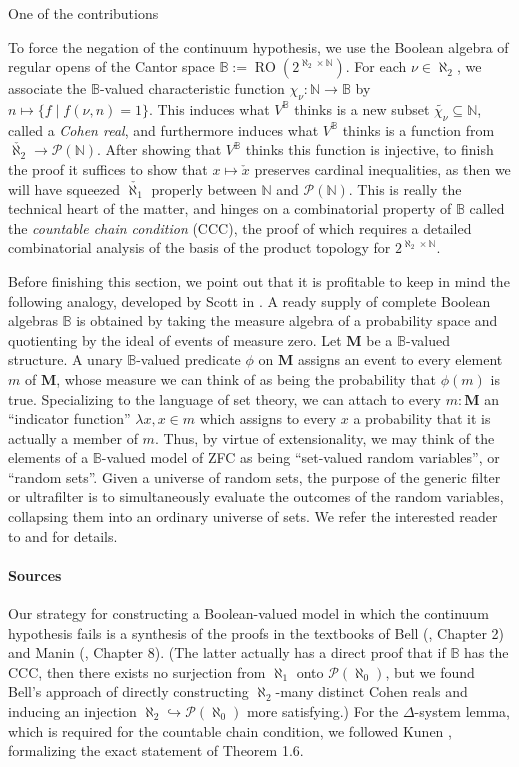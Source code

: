 \documentclass[a4paper,USenglish,cleveref, autoref]{lipics-v2019}
\newcommand{\B}{\mathbb{B}}
\begin{document}
One of the contributions 

To force the negation of the continuum hypothesis, we use the Boolean algebra of regular opens of the Cantor space $\B := \operatorname{RO}(2^{\aleph_2 \times \mathbb{N}})$. For each $\nu \in \aleph_2$, we associate the $\B$-valued characteristic function $\chi_\nu : \mathbb{N} \to \B$ by $n \mapsto \{f \operatorname{|} f(\nu, n) = 1\}$. This induces what $V^\B$ thinks is a new subset $\widetilde{\chi_{\nu}} \subseteq \mathbb{N}$, called a \emph{Cohen real}, and furthermore induces what $V^\B$ thinks is a function from $\check{\aleph_2} \to \mathcal{P}(\mathbb{N})$. After showing that $V^\B$ thinks this function is injective, to finish the proof it suffices to show that $x \mapsto \check{x}$ preserves cardinal inequalities, as then we will have squeezed $\check{\aleph_1}$ properly between $\mathbb{N}$ and $\mathcal{P}(\mathbb{N})$. This is really the technical heart of the matter, and hinges on a combinatorial property of $\B$ called the \emph{countable chain condition} (CCC), the proof of which requires a detailed combinatorial analysis of the basis of the product topology for $2^{\aleph_2 \times \mathbb{N}}$.

Before finishing this section, we point out that it is profitable to keep in mind the following analogy, developed by Scott in \cite{scott1}. A ready supply of complete Boolean algebras $\B$ is obtained by taking the measure algebra of a probability space and quotienting by the ideal of events of measure zero. Let $\mathbf{M}$ be a $\B$-valued structure. A unary $\B$-valued predicate $\phi$ on $\mathbf{M}$ assigns an event to every element $m$ of $\mathbf{M}$, whose measure we can think of as being the probability that $\phi(m)$ is true. Specializing to the language of set theory, we can attach to every $m : \mathbf{M}$ an ``indicator function'' $\lambda x, x \in m$ which assigns to every $x$ a probability that it is actually a member of $m$. Thus, by virtue of extensionality, we may think of the elements of a $\B$-valued model of ZFC as being ``set-valued random variables'', or ``random sets''. Given a universe of random sets, the purpose of the generic filter or ultrafilter is to simultaneously evaluate the outcomes of the random variables, collapsing them into an ordinary universe of sets. We refer the interested reader to \cite{scott1} and \cite{moore1} for details.

\paragraph*{Sources}
Our strategy for constructing a Boolean-valued model in which the continuum hypothesis fails is a synthesis of the proofs in the textbooks of Bell (\cite{bell1}, Chapter 2) and Manin (\cite{manin1}, Chapter 8). (The latter actually has a direct proof that if $\B$ has the CCC, then there exists no surjection from $\aleph_1$ onto $\mathcal{P}(\aleph_0)$, but we found Bell's approach of directly constructing $\aleph_2$-many distinct Cohen reals and inducing an injection $\aleph_2 \hookrightarrow \mathcal{P}(\aleph_0)$ more satisfying.) For the $\Delta$-system lemma, which is required for the countable chain condition, we followed Kunen \cite{kunen1}, formalizing the exact statement of Theorem 1.6.
\end{document}
